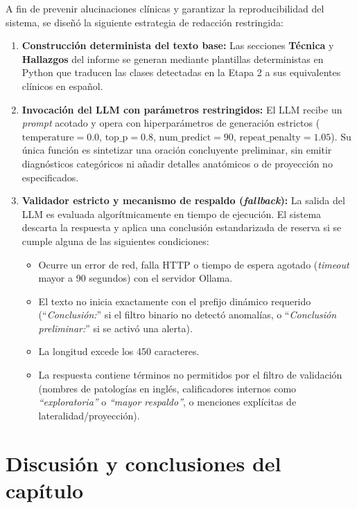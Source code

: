 \documentclass[../main.tex]{subfiles}
\begin{document}
A fin de prevenir alucinaciones clínicas y garantizar la reproducibilidad del sistema, se diseñó la siguiente estrategia de redacción restringida:

\begin{enumerate}
    \item \textbf{Construcción determinista del texto base:} Las secciones \textbf{Técnica} y \textbf{Hallazgos} del informe se generan mediante plantillas deterministas en Python que traducen las clases detectadas en la Etapa 2 a sus equivalentes clínicos en español.
    
    \item \textbf{Invocación del LLM con parámetros restringidos:} El LLM recibe un \textit{prompt} acotado y opera con hiperparámetros de generación estrictos ($\text{temperature} = 0.0$, $\text{top\_p} = 0.8$, $\text{num\_predict} = 90$, $\text{repeat\_penalty} = 1.05$). Su única función es sintetizar una oración concluyente preliminar, sin emitir diagnósticos categóricos ni añadir detalles anatómicos o de proyección no especificados.
    
    \item \textbf{Validador estricto y mecanismo de respaldo (\textit{fallback}):} La salida del LLM es evaluada algorítmicamente en tiempo de ejecución. El sistema descarta la respuesta y aplica una conclusión estandarizada de reserva si se cumple alguna de las siguientes condiciones:
    \begin{itemize}
        \item Ocurre un error de red, falla HTTP o tiempo de espera agotado (\textit{timeout} mayor a 90 segundos) con el servidor Ollama.
        \item El texto no inicia exactamente con el prefijo dinámico requerido (``\textit{Conclusión:}'' si el filtro binario no detectó anomalías, o ``\textit{Conclusión preliminar:}'' si se activó una alerta).
        \item La longitud excede los 450 caracteres.
        \item La respuesta contiene términos no permitidos por el filtro de validación (nombres de patologías en inglés, calificadores internos como \textit{``exploratoria''} o \textit{``mayor respaldo''}, o menciones explícitas de lateralidad/proyección).
    \end{itemize}
\end{enumerate}





\section{Discusión y conclusiones del capítulo}
\end{document}
